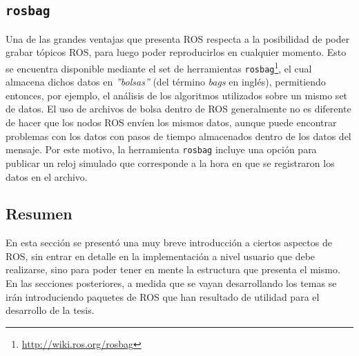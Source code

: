 \subsection{\texttt{rosbag}}
Una de las grandes ventajas que presenta ROS respecta a la posibilidad de poder grabar tópicos ROS, para luego poder reproducirlos en cualquier momento. Esto se encuentra disponible mediante el set de herramientas \texttt{rosbag}\footnote{\url{http://wiki.ros.org/rosbag}}, el cual almacena dichos datos en \textit{''bolsas''} (del término \textit{bags} en inglés), permitiendo entonces, por ejemplo, el análisis de los algoritmos utilizados sobre un mismo set de datos. El uso de archivos de bolsa dentro de ROS generalmente no es diferente de hacer que los nodos ROS envíen los mismos datos, aunque puede encontrar problemas con los datos con pasos de tiempo almacenados dentro de los datos del mensaje. Por este motivo, la herramienta \texttt{rosbag} incluye una opción para publicar un reloj simulado que corresponde a la hora en que se registraron los datos en el archivo.

\subsection{Resumen}
En esta sección se presentó una muy breve introducción a ciertos aspectos de ROS, sin entrar en detalle en la implementación a nivel usuario que debe realizarse, sino para poder tener en mente la estructura que presenta el mismo. En las secciones posteriores, a medida que se vayan desarrollando los temas se irán introduciendo paquetes de ROS que han resultado de utilidad para el desarrollo de la tesis.